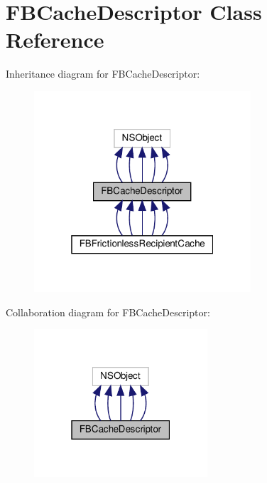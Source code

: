 \hypertarget{interfaceFBCacheDescriptor}{}\section{F\+B\+Cache\+Descriptor Class Reference}
\label{interfaceFBCacheDescriptor}


Inheritance diagram for F\+B\+Cache\+Descriptor\+:
\nopagebreak
\begin{figure}[H]
\begin{center}
\leavevmode
\includegraphics[width=229pt]{interfaceFBCacheDescriptor__inherit__graph}
\end{center}
\end{figure}


Collaboration diagram for F\+B\+Cache\+Descriptor\+:
\nopagebreak
\begin{figure}[H]
\begin{center}
\leavevmode
\includegraphics[width=183pt]{interfaceFBCacheDescriptor__coll__graph}
\end{center}
\end{figure}

